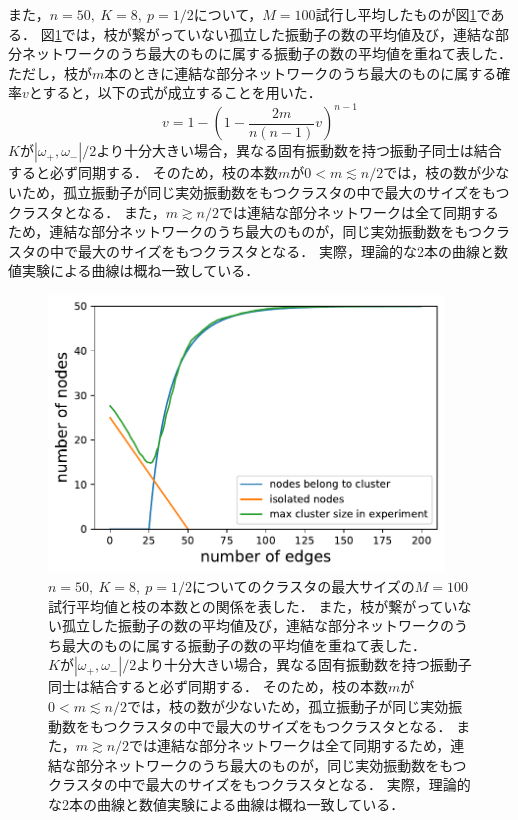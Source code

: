 \documentclass[../main]{subfiles}
\begin{document}
また，$n=50,\ K=8,\ p=1/2$について，$M=100$試行し平均したものが図\ref{fig:edge-cutting-K8-maxsize}である．
図\ref{fig:edge-cutting-K8-maxsize}では，枝が繋がっていない孤立した振動子の数の平均値及び，連結な部分ネットワークのうち最大のものに属する振動子の数の平均値を重ねて表した．
ただし，枝が$m$本のときに連結な部分ネットワークのうち最大のものに属する確率$v$とすると，以下の式が成立することを用いた．
\[v=1-\left( 1-\frac{2m}{n(n-1)}v \right)^{n-1}\]
$K$が$|\omega_+,\omega_-|/2$より十分大きい場合，異なる固有振動数を持つ振動子同士は結合すると必ず同期する．
そのため，枝の本数$m$が$0<m\lesssim n/2$では，枝の数が少ないため，孤立振動子が同じ実効振動数をもつクラスタの中で最大のサイズをもつクラスタとなる．
また，$m\gtrsim n/2$では連結な部分ネットワークは全て同期するため，連結な部分ネットワークのうち最大のものが，同じ実効振動数をもつクラスタの中で最大のサイズをもつクラスタとなる．
実際，理論的な2本の曲線と数値実験による曲線は概ね一致している．
\begin{figure}[tbp]
\centering
\includegraphics[width=105mm]{./images/edge-finite-maxsize-delta000038000-compare.pdf}
\centering
\caption{$n=50,\ K=8,\ p=1/2$についてのクラスタの最大サイズの$M=100$試行平均値と枝の本数との関係を表した．
また，枝が繋がっていない孤立した振動子の数の平均値及び，連結な部分ネットワークのうち最大のものに属する振動子の数の平均値を重ねて表した．\\
$K$が$|\omega_+,\omega_-|/2$より十分大きい場合，異なる固有振動数を持つ振動子同士は結合すると必ず同期する．
そのため，枝の本数$m$が$0<m\lesssim n/2$では，枝の数が少ないため，孤立振動子が同じ実効振動数をもつクラスタの中で最大のサイズをもつクラスタとなる．
また，$m\gtrsim n/2$では連結な部分ネットワークは全て同期するため，連結な部分ネットワークのうち最大のものが，同じ実効振動数をもつクラスタの中で最大のサイズをもつクラスタとなる．
実際，理論的な2本の曲線と数値実験による曲線は概ね一致している．}
\label{fig:edge-cutting-K8-maxsize}
\end{figure}
\end{document}
